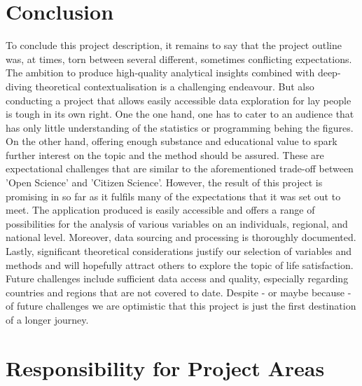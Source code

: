 \documentclass[preprint,12pt,authoryear]{elsarticle}
\begin{document}
\section{Conclusion}
To conclude this project description, it remains to say that the project outline was, at times, torn between several 
different, sometimes conflicting expectations. The ambition to produce high-quality analytical insights combined with 
deep-diving theoretical contextualisation is a challenging endeavour. But also conducting a project that allows easily accessible 
data exploration for lay people is tough in its own right. One the one hand, one has to cater to an audience that has only
little understanding of the statistics or programming behing the figures. On the other hand, 
offering enough substance and educational value to spark further interest on the topic and the method should be assured.
These are expectational challenges that are similar to the aforementioned trade-off between 'Open Science' and 'Citizen
Science'. However, the result of this project is promising in so far as it fulfils many of the expectations that it was set out
to meet. The application produced is easily accessible and offers a range of possibilities for the analysis of various
variables on an individuals, regional, and national level. 
Moreover, data sourcing and processing is thoroughly documented. Lastly, significant theoretical considerations
justify our selection of variables and methods and will hopefully attract others to explore the topic of life satisfaction.\\
Future challenges include sufficient data access and quality, especially regarding countries and regions that are not covered to date.
Despite - or maybe because - of future challenges we are optimistic that this project is just the first destination of a longer journey. 
\newpage
 \appendix
	
\section{Responsibility for Project Areas}
\end{document}
